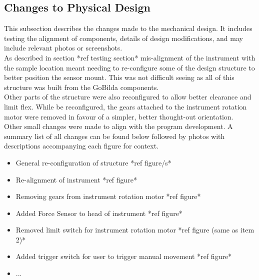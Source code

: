\documentclass{UoNMCHA}
\numberwithin{equation}{section}
\begin{document}
\subsection{Changes to Physical Design}\label{sub:Changes to Physical Design}
This subsection describes the changes made to the mechanical design. It includes testing the alignment of components, details of design modifications, and may include relevant photos or screenshots. \\
As described in section *ref testing section* mis-alignment of the instrument with the sample location meant needing to re-configure some of the design structure to better position the sensor mount. This was not difficult seeing as all of this structure was built from the GoBilda components. \\
Other parts of the structure were also reconfigured to allow better clearance and limit flex. While be reconfigured, the gears attached to the instrument rotation motor were removed in favour of a simpler, better thought-out orientation. \\
Other small changes were made to align with the program development. A summary list of all changes can be found below followed by photos with descriptions accompanying each figure for context. \\
\begin{itemize}
	\item General re-configuration of structure *ref figure/s*
	\item Re-alignment of instrument *ref figure*
	\item Removing gears from instrument rotation motor *ref figure*
	\item Added Force Sensor to head of instrument *ref figure*
	\item Removed limit switch for instrument rotation motor *ref figure (same as item 2)*
	\item Added trigger switch for user to trigger manual movement *ref figure*
	\item ...
\end{itemize}
\end{document}
